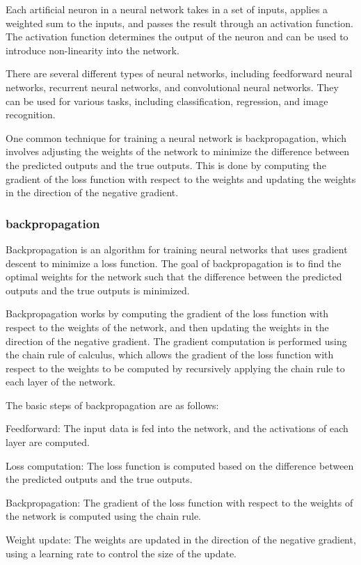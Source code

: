 \documentclass[12pt, a4paper, oneside]{article}
\begin{document}
Each artificial neuron in a neural network takes in a set of inputs, applies a weighted sum to the inputs, and passes the result through an activation function. The activation function determines the output of the neuron and can be used to introduce non-linearity into the network.

There are several different types of neural networks, including feedforward neural networks, recurrent neural networks, and convolutional neural networks. They can be used for various tasks, including classification, regression, and image recognition.

One common technique for training a neural network is backpropagation, which involves adjusting the weights of the network to minimize the difference between the predicted outputs and the true outputs. This is done by computing the gradient of the loss function with respect to the weights and updating the weights in the direction of the negative gradient.
\subsubsection{backpropagation}
Backpropagation is an algorithm for training neural networks that uses gradient descent to minimize a loss function. The goal of backpropagation is to find the optimal weights for the network such that the difference between the predicted outputs and the true outputs is minimized.

Backpropagation works by computing the gradient of the loss function with respect to the weights of the network, and then updating the weights in the direction of the negative gradient. The gradient computation is performed using the chain rule of calculus, which allows the gradient of the loss function with respect to the weights to be computed by recursively applying the chain rule to each layer of the network.

The basic steps of backpropagation are as follows:

Feedforward: The input data is fed into the network, and the activations of each layer are computed.

Loss computation: The loss function is computed based on the difference between the predicted outputs and the true outputs.

Backpropagation: The gradient of the loss function with respect to the weights of the network is computed using the chain rule.

Weight update: The weights are updated in the direction of the negative gradient, using a learning rate to control the size of the update.
\end{document}
